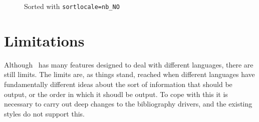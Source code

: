 \begin{figure}
\caption{Sorted with \texttt{sortlocale=nb\_NO}\label{zebra:no}}
\end{figure}

\section{Limitations}
Although \biblatex\ has many features designed to deal with different
languages, there are still limits. The limits are, as things stand,
reached when different languages have fundamentally different ideas
about the sort of information that should be output, or the order in
which it shoudl be output. To cope with this it is necessary to carry
out deep changes to the bibliography drivers, and the existing styles
do not support this.

